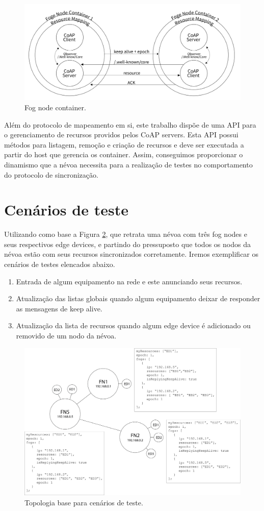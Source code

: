 \begin{figure}[H]
    \centering\includegraphics[width=.8\textwidth]{fig13.png}
    \caption [Fog node container]
    {\label{fig:fig13} Fog node container.}
\end{figure}


Além do protocolo de mapeamento em si, este trabalho dispõe de uma API para o gerenciamento de recursos providos pelos CoAP servers.
Esta API possui métodos para listagem, remoção e criação de recursos e deve ser executada a partir do host que gerencia os container.
Assim, conseguimos proporcionar o dinamismo que a névoa necessita para a realização de testes no comportamento do protocolo de sincronização.


\section{Cenários de teste}


Utilizando como base a Figura \ref{fig:fig7}, que retrata uma névoa com três fog nodes e seus respectivos edge devices, e partindo do pressuposto que todos os nodos da névoa estão com seus recursos sincronizados corretamente.
Iremos exemplificar os cenários de testes elencados abaixo.

\begin{enumerate}
    \item Entrada de algum equipamento na rede e este anunciando seus recursos. 
    \item Atualização das listas globais quando algum equipamento deixar de responder as mensagens de keep alive.
    \item Atualização da lista de recursos quando algum edge device é adicionado ou removido de um nodo da névoa.
\end{enumerate}

\begin{figure}[H]
    \centering\includegraphics[width=.8\textwidth]{fig7.png}
    \caption[Topologia base para cenários de teste]
    {\label{fig:fig7} Topologia base para cenários de teste.}
\end{figure}

